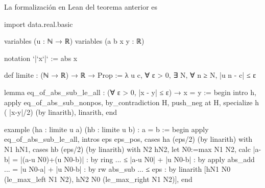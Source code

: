 La formalización en Lean del teorema anterior es
\begin{leancode}
import data.real.basic

variables (u : ℕ → ℝ)
variables (a b x y : ℝ)

notation `|`x`|` := abs x

def limite : (ℕ → ℝ) → ℝ → Prop :=
λ u c, ∀ ε > 0, ∃ N, ∀ n ≥ N, |u n - c| ≤ ε

lemma eq_of_abs_sub_le_all
: (∀ ε > 0, |x - y| ≤ ε) → x = y :=
begin
intro h,
apply eq_of_abs_sub_nonpos,
by_contradiction H,
push_neg at H,
specialize h ( |x-y|/2) (by linarith),
linarith,
end

example
(ha : limite u a)
(hb : limite u b)
: a = b :=
begin
apply eq_of_abs_sub_le_all,
intros eps eps_pos,
cases ha (eps/2) (by linarith) with N1 hN1,
cases hb (eps/2) (by linarith) with N2 hN2,
let N0:=max N1 N2,
calc  |a-b|
    = |(a-u N0)+(u N0-b)| : by ring
... ≤ |a-u N0| + |u N0-b| : by apply abs_add
... = |u N0-a| + |u N0-b| : by rw abs_sub
... ≤ eps                 : by linarith [hN1 N0 (le_max_left N1 N2),
                                         hN2 N0 (le_max_right N1 N2)],
end
\end{leancode}

